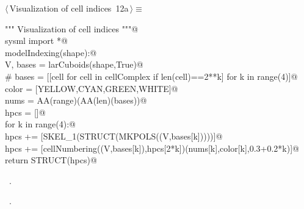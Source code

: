 \documentclass[11pt,oneside]{article}	%
\begin{document}
\begin{flushleft} \small \label{scrap22}
\protect{}$\langle\,$Visualization of cell indices\nobreak\ {\footnotesize 12a}$\,\rangle\equiv$
\vspace{-1ex}
\begin{list}{}{} \item
\mbox{}\verb@""" Visualization of cell indices """@\\
\mbox{}\verb@from sysml import *@\\
\mbox{}\verb@def modelIndexing(shape):@\\
\mbox{}\verb@   V, bases = larCuboids(shape,True)@\\
\mbox{}\verb@   # bases = [[cell for cell in cellComplex if len(cell)==2**k] for k in range(4)]@\\
\mbox{}\verb@   color = [YELLOW,CYAN,GREEN,WHITE]@\\
\mbox{}\verb@   nums = AA(range)(AA(len)(bases))@\\
\mbox{}\verb@   hpcs = []@\\
\mbox{}\verb@   for k in range(4):@\\
\mbox{}\verb@      hpcs += [SKEL_1(STRUCT(MKPOLS((V,bases[k]))))]@\\
\mbox{}\verb@      hpcs += [cellNumbering((V,bases[k]),hpcs[2*k])(nums[k],color[k],0.3+0.2*k)]@\\
\mbox{}\verb@   return STRUCT(hpcs)@\\
\mbox{}\verb@@{\NWsep}
\end{list}
\vspace{-1ex}
\footnotesize\addtolength{\baselineskip}{-1ex}
\begin{list}{}{\setlength{\itemsep}{-\parsep}\setlength{\itemindent}{-\leftmargin}}
\item \NWtxtMacroDefBy\ .
\item \NWtxtMacroRefIn\ .
\end{list}
\end{flushleft}
\end{document}
